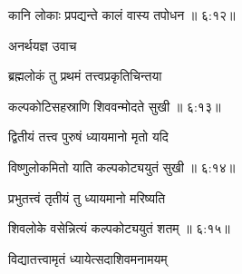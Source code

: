 {\devanagarifont कानि लोकाः प्रपद्यन्ते कालं वास्य तपोधन {॥ ६:१२॥} \veg\dontdisplaylinenum }%

{\devanagarifont अनर्थयज्ञ उवाच {\dandab}\dontdisplaylinenum  }%
 
{\devanagarifont ब्रह्मलोकं तु प्रथमं तत्त्वप्रकृतिचिन्तया \thinspace{\danda} \dontdisplaylinenum }%


{\devanagarifont कल्पकोटिसहस्राणि शिववन्मोदते सुखी {॥ ६:१३॥} \veg\dontdisplaylinenum }%

{\devanagarifont द्वितीयं तत्त्व पुरुषं ध्यायमानो मृतो यदि \thinspace{\dandab} \dontdisplaylinenum }%
 

{\devanagarifont विष्णुलोकमितो याति कल्पकोट्ययुतं सुखी {॥ ६:१४॥} \veg\dontdisplaylinenum }%

{\devanagarifont प्रभुतत्त्वं तृतीयं तु ध्यायमानो मरिष्यति \thinspace{\dandab} \dontdisplaylinenum }%


{\devanagarifont शिवलोके वसेन्नित्यं कल्पकोट्ययुतं शतम् {॥ ६:१५॥} \veg\dontdisplaylinenum }%

{\devanagarifont विद्यातत्त्वामृतं ध्यायेत्सदाशिवमनामयम् \thinspace{\dandab} \dontdisplaylinenum }%



